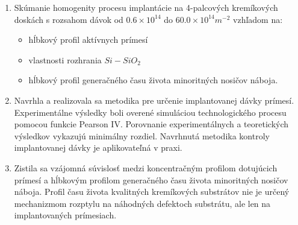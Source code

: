 \begin{enumerate}
\item Skúmanie homogenity procesu implantácie na 4-palcových
  kremíkových doskách s rozsahom dávok od $0.6 \times 10^{14}$ do
  $60.0 \times 10^{14} m^{-2}$ vzhľadom na:
\begin{itemize}
\item hĺbkový profil aktívnych prímesí
\item vlastnosti rozhrania $Si-SiO_{2}$
\item hĺbkový profil generačného času života minoritných nosičov
  náboja.
\end{itemize}

\item Navrhla a realizovala sa metodika pre určenie implantovanej
  dávky prímesí. Experimentálne výsledky boli overené simuláciou
  technologického procesu pomocou funkcie Pearson IV. Porovnanie
  experimentálnych a teoretických výsledkov vykazujú minimálny
  rozdiel. Navrhnutá metodika kontroly implantovanej dávky je
  aplikovateľná v praxi.

\item Zistila sa vzájomná súvislosť medzi koncentračným profilom
  dotujúcich prímesí a hĺbkovým profilom generačného času života
  minoritných nosičov náboja. Profil času života kvalitných
  kremíkových substrátov nie je určený mechanizmom rozptylu na
  náhodných defektoch substrátu, ale len na implantovaných prímesiach.

\end{enumerate}
